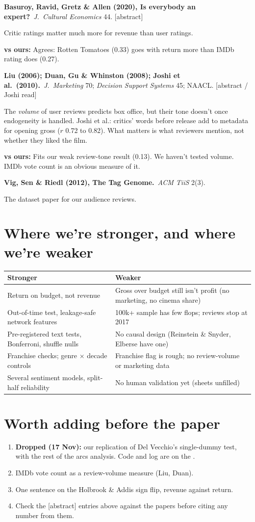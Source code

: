 \documentclass[10pt]{article}
\newcommand{\paper}[2]{\par\smallskip\textbf{#1}\ #2\par}
\newcommand{\vs}[1]{\par{\color{accent}\textbf{vs ours:}} #1\par}
\newcommand{\src}[1]{{\small\color{muted}[#1]}}
\begin{document}
\paper{Basuroy, Ravid, Gretz \& Allen (2020), Is everybody an expert?}{\textit{J.\ Cultural Economics} 44. \src{abstract}}
Critic ratings matter much more for revenue than user ratings.
\vs{Agrees: Rotten Tomatoes (0.33) goes with return more than IMDb rating does (0.27).}

\paper{Liu (2006); Duan, Gu \& Whinston (2008); Joshi et al.\ (2010).}{\textit{J.\ Marketing} 70; \textit{Decision Support Systems} 45; NAACL. \src{abstract / Joshi read}}
The \emph{volume} of user reviews predicts box office, but their tone doesn't once endogeneity is handled. Joshi et al.: critics' words before release add to metadata for opening gross ($r$ 0.72 to 0.82). What matters is what reviewers mention, not whether they liked the film.
\vs{Fits our weak review-tone result (0.13). We haven't tested volume. IMDb vote count is an obvious measure of it.}

\paper{Vig, Sen \& Riedl (2012), The Tag Genome.}{\textit{ACM TiiS} 2(3).}
The dataset paper for our audience reviews.

\section{Where we're stronger, and where we're weaker}
\begin{tabularx}{\linewidth}{@{}LL@{}}
\toprule
\textbf{Stronger} & \textbf{Weaker} \\
\midrule
Return on budget, not revenue & Gross over budget still isn't profit (no marketing, no cinema share) \\
Out-of-time test, leakage-safe network features & 100k+ sample has few flops; reviews stop at 2017 \\
Pre-registered text tests, Bonferroni, shuffle nulls & No causal design (Reinstein \& Snyder, Elberse have one) \\
Franchise checks; genre $\times$ decade controls & Franchise flag is rough; no review-volume or marketing data \\
Several sentiment models, split-half reliability & No human validation yet (sheets unfilled) \\
\bottomrule
\end{tabularx}

\section{Worth adding before the paper}
\begin{enumerate}
  \item \textbf{Dropped (17 Nov):} our replication of Del Vecchio's single-dummy test, with the rest of the arcs analysis. Code and log are on the .
  \item IMDb vote count as a review-volume measure (Liu, Duan).
  \item One sentence on the Holbrook \& Addis sign flip, revenue against return.
  \item Check the \src{abstract} entries above against the papers before citing any number from them.
\end{enumerate}
\end{document}
